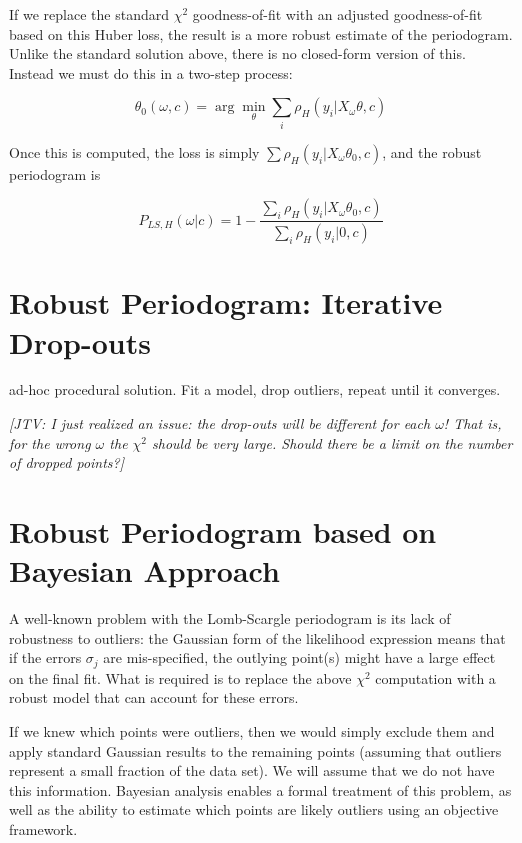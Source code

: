 \documentclass[12pt,pdftex]{article}
\newcommand{\jake}[1]{{\color{blue}\it[JTV: #1]}}
\begin{document}
If we replace the standard $\chi^2$ goodness-of-fit with an adjusted goodness-of-fit based on this Huber loss, the result is a more robust estimate of the periodogram. Unlike the standard solution above, there is no closed-form version of this. Instead we must do this in a two-step process:

\begin{equation}
  \theta_0(\omega, c) = \arg\min_\theta \sum_i\rho_H(y_i|X_\omega\theta, c)
\end{equation}

Once this is computed, the loss is simply $\sum\rho_H(y_i|X_\omega\theta_0,c)$, and the robust periodogram is

\begin{equation}
  P_{LS,H}(\omega|c) = 1 - \frac{\sum_i\rho_H(y_i|X_\omega\theta_0,c)}{\sum_i\rho_H(y_i|0,c)}
\end{equation}

\section{Robust Periodogram: Iterative Drop-outs}
ad-hoc procedural solution. Fit a model, drop outliers, repeat until it converges.

\jake{I just realized an issue: the drop-outs will be different for each $\omega$! That is, for the wrong $\omega$ the $\chi^2$ should be very large. Should there be a limit on the number of dropped points?}


\section{Robust Periodogram based on Bayesian Approach}

A well-known problem with the Lomb-Scargle periodogram is its lack of robustness to outliers: the Gaussian form of the likelihood expression means that if the errors $\sigma_j$ are mis-specified, the outlying point(s) might have a large effect on the final fit. 
What is required is to replace the above $\chi^2$ computation with a robust model that can account for these errors.

If we knew which points were outliers, then we would simply exclude them and
apply standard Gaussian results to the remaining points (assuming that outliers
represent a small fraction of the data set). We will assume that we do not have this
information. Bayesian analysis enables a formal treatment of this problem, as well 
as the ability to estimate which points are likely outliers using an objective framework.
\end{document}
